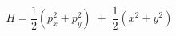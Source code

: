 \begin{equation}
H = \frac{1}{2} \left( p^2_x + p^2_y \right) \; + \;	
		\frac{1}{2} \left( x^2 + y^2 \right) 
\nonumber
\end{equation}

